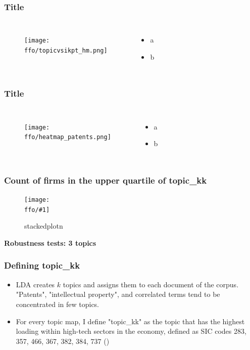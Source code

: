 \documentclass{beamer}
\newcommand{\ffo}{dicfullmc10thr10defnob40noa1_4t}
\newcommand{\ffoiii}{dicfullmc10thr10defnob5noa0_8_3t}
\newcommand{\insertfigure}[2]{
\begin{figure}[h!]
  \centering
  \texttt{[image: \\ffo/\#1]}
  \centering
  \captionsetup{font=scriptsize}
  \caption{#2}
  \label{fig:#1}
\end{figure}
}
\begin{document}
\begin{frame}
\frametitle{Title}
       \begin{columns}
             \begin{figure}[h!]
		  \centering
		  \texttt{[image: \\ffo/topicvsikpt\_hm.png]}
		  \centering
		  \captionsetup{font=scriptsize}
		  \label{fig:topicvsikpt_hm}
			\end{figure}
          \scriptsize
              \begin{itemize}
			  \item a
			  \item b
			\end{itemize}
	  \end{columns} 
\end{frame}

\begin{frame}
\frametitle{Title}
       \begin{columns}
             \begin{figure}[h!]
		  \centering
		  \texttt{[image: \\ffo/heatmap\_patents.png]}
		  \captionsetup{font=scriptsize}
		  \label{fig:heatmappatents}
			\end{figure}
          \scriptsize
              \begin{itemize}
			  \item a
			  \item b
			\end{itemize}
	  \end{columns} 
\end{frame}

\begin{frame}
\frametitle{Count of firms in the upper quartile of topic\_kk}
\insertfigure{stackedplot_n}{stackedplotn}
\end{frame}

\begin{frame}
\label{robthree}
\centering
\huge\bfseries Robustness tests: 3 topics
\hyperlink{results}{}
\end{frame}

\begin{frame}
  \frametitle{Defining topic\_kk}
  \begin{itemize}
  \item LDA creates $k$ topics and assigns them to each document of the corpus. "Patents", "intellectual property", and correlated terms tend to be concentrated in few topics.
  \item For every topic map, I define "topic\_kk" as the topic that has the highest loading within high-tech sectors in the economy, defined as SIC codes 283, 357, 466, 367, 382, 384, 737 (\cite{Brown2009-zp}) 
  
\end{itemize}

\end{frame}
\end{document}
